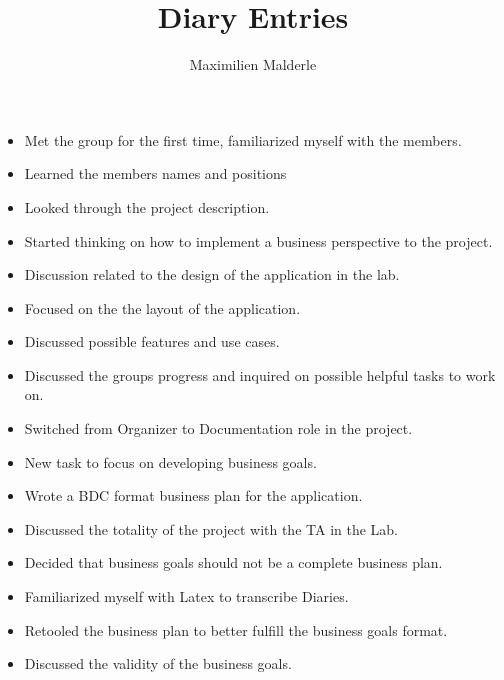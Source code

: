 \documentclass{article}
\title{Diary Entries}
\author{Maximilien Malderle}
\begin{document}
	\maketitle
	
  \begin{itemize}
        \item Met the group for the first time, familiarized myself with the members.  
        \item Learned the members names and positions
        \item Looked through the project description.
		\item Started thinking on how to implement a business perspective to the project.
  \end{itemize}
  
	
  \begin{itemize}
        \item Discussion related to the design of the application in the lab.
        \item Focused on the the layout of the application.
        \item Discussed possible features and use cases.
  \end{itemize}
  
  \begin{itemize}
    \item Discussed the groups progress and inquired on possible helpful         tasks to work on.
    \item Switched from Organizer to Documentation role in the project.
    \item New task to focus on developing business goals.
  \end{itemize}

  \begin{itemize}
    \item Wrote a BDC format business plan for the application.
    \item Discussed the totality of the project with the TA in the Lab.
    \item Decided that business goals should not be a complete business plan.
  \end{itemize}

  \begin{itemize}
    \item Familiarized myself with Latex to transcribe Diaries.
    \item Retooled the business plan to better fulfill the business goals format.
    \item Discussed the validity of the business goals.
  \end{itemize}

  
\end{document}
